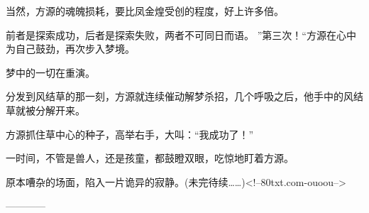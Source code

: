 \begin{this_body}
当然，方源的魂魄损耗，要比凤金煌受创的程度，好上许多倍。

前者是探索成功，后者是探索失败，两者不可同日而语。 ”第三次！“方源在心中为自己鼓劲，再次步入梦境。

梦中的一切在重演。

分发到风结草的那一刻，方源就连续催动解梦杀招，几个呼吸之后，他手中的风结草就被分解开来。

方源抓住草中心的种子，高举右手，大叫：“我成功了！”

一时间，不管是兽人，还是孩童，都鼓瞪双眼，吃惊地盯着方源。

原本嘈杂的场面，陷入一片诡异的寂静。(未完待续……)<!--80txt.com-ouoou-->

------------

\end{this_body}

